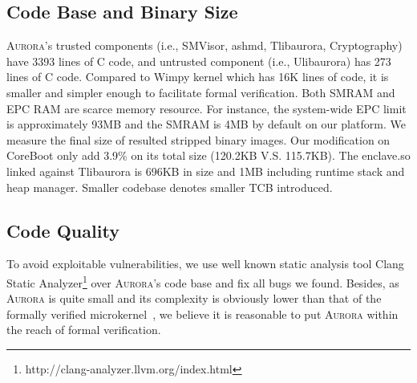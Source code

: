 


\subsection{Code Base and Binary Size}\label{codebase}
\textsc{Aurora}'s trusted components (i.e., SMVisor, ashmd, Tlibaurora, Cryptography) have 3393 lines of C code, and untrusted component (i.e., Ulibaurora) has 273 lines of C code. Compared to Wimpy kernel \cite{zhou_dancing_2014} which has 16K lines of code, it is smaller and simpler enough to facilitate formal verification.
Both SMRAM and EPC RAM are scarce memory resource. For instance, the system-wide EPC limit is approximately 93MB and the SMRAM is 4MB by default on our platform. We measure the final size of resulted stripped binary images. Our modification on CoreBoot only add 3.9\% on its total size (120.2KB V.S. 115.7KB). The enclave.so  linked against Tlibaurora is 696KB in size and 1MB including runtime stack and heap manager. Smaller codebase denotes smaller TCB introduced. %

\subsection{Code Quality}
To avoid exploitable vulnerabilities, we use well known static analysis tool Clang Static Analyzer\footnote{http://clang-analyzer.llvm.org/index.html} over \textsc{Aurora}'s code base and fix all bugs we found. Besides, as \textsc{Aurora} is quite small and its complexity is obviously lower than that of the formally verified microkernel~\cite{DBLP:conf/sosp/KleinEHACDEEKNSTW09}, we believe it is reasonable to put \textsc{Aurora} within the reach of formal verification.


